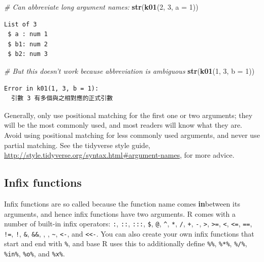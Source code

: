 \documentclass[]{book}
\newenvironment{Shaded}{\begin{snugshade}}{\end{snugshade}}
\newcommand{\CommentTok}[1]{\textcolor[rgb]{0.56,0.35,0.01}{\textit{#1}}}
\newcommand{\DataTypeTok}[1]{\textcolor[rgb]{0.13,0.29,0.53}{#1}}
\newcommand{\DecValTok}[1]{\textcolor[rgb]{0.00,0.00,0.81}{#1}}
\newcommand{\KeywordTok}[1]{\textcolor[rgb]{0.13,0.29,0.53}{\textbf{#1}}}
\newcommand{\NormalTok}[1]{#1}
\theoremstyle{definition}
\theoremstyle{definition}
\theoremstyle{definition}
\theoremstyle{remark}
\begin{document}
\begin{Shaded}
\begin{Highlighting}[]
\CommentTok{# Can abbreviate long argument names:}
\KeywordTok{str}\NormalTok{(}\KeywordTok{k01}\NormalTok{(}\DecValTok{2}\NormalTok{, }\DecValTok{3}\NormalTok{, }\DataTypeTok{a =} \DecValTok{1}\NormalTok{))}
\end{Highlighting}
\end{Shaded}

\begin{verbatim}
List of 3
 $ a : num 1
 $ b1: num 2
 $ b2: num 3
\end{verbatim}

\begin{Shaded}
\begin{Highlighting}[]
\CommentTok{# But this doesn't work because abbreviation is ambiguous}
\KeywordTok{str}\NormalTok{(}\KeywordTok{k01}\NormalTok{(}\DecValTok{1}\NormalTok{, }\DecValTok{3}\NormalTok{, }\DataTypeTok{b =} \DecValTok{1}\NormalTok{))}
\end{Highlighting}
\end{Shaded}

\begin{verbatim}
Error in k01(1, 3, b = 1):
  引數 3 有多個與之相對應的正式引數
\end{verbatim}

Generally, only use positional matching for the first one or two
arguments; they will be the most commonly used, and most readers will
know what they are. Avoid using positional matching for less commonly
used arguments, and never use partial matching. See the tidyverse style
guide, \url{http://style.tidyverse.org/syntax.html\#argument-names}, for
more advice.

\hypertarget{infix-functions}{%
\subsection{Infix functions}\label{infix-functions}}

Infix functions are so called because the function name comes
\textbf{in}between its arguments, and hence infix functions have two
arguments. R comes with a number of built-in infix operators:
\texttt{:}, \texttt{::}, \texttt{:::}, \texttt{\$}, \texttt{@},
\texttt{\^{}}, \texttt{*}, \texttt{/}, \texttt{+}, \texttt{-},
\texttt{\textgreater{}}, \texttt{\textgreater{}=}, \texttt{\textless{}},
\texttt{\textless{}=}, \texttt{==}, \texttt{!=}, \texttt{!},
\texttt{\&}, \texttt{\&\&}, \texttt{\textbar{}},
\texttt{\textbar{}\textbar{}}, \texttt{\textasciitilde{}},
\texttt{\textless{}-}, and \texttt{\textless{}\textless{}-}. You can
also create your own infix functions that start and end with
\texttt{\%}, and base R uses this to additionally define \texttt{\%\%},
\texttt{\%*\%}, \texttt{\%/\%}, \texttt{\%in\%}, \texttt{\%o\%}, and
\texttt{\%x\%}.
\end{document}
